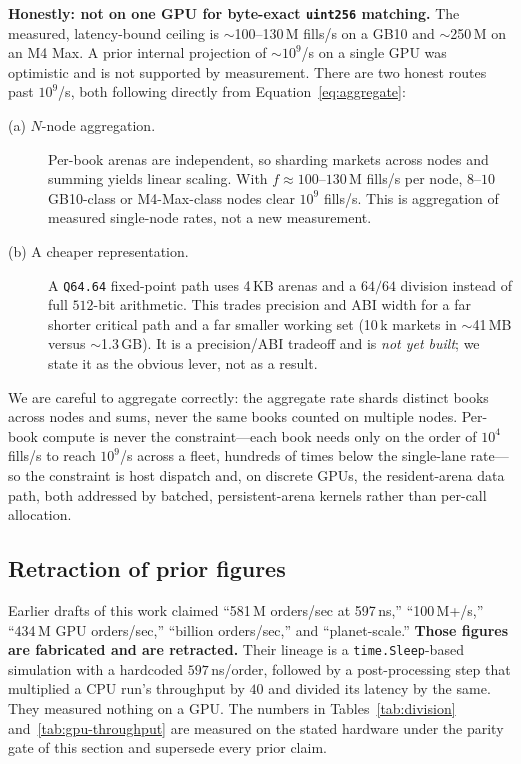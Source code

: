 \textbf{Honestly: not on one GPU for byte-exact \texttt{uint256} matching.} The measured,
latency-bound ceiling is $\sim$100--130\,M fills/s on a GB10 and $\sim$250\,M on an M4 Max.
A prior internal projection of $\sim$$10^{9}$/s on a single GPU was optimistic and is not
supported by measurement. There are two honest routes past $10^{9}$/s, both following
directly from Equation~\eqref{eq:aggregate}:

\begin{description}
  \item[(a) $N$-node aggregation.] Per-book arenas are independent, so sharding markets
  across nodes and summing yields linear scaling. With $f \approx 100\text{--}130$\,M
  fills/s per node, $8$--$10$ GB10-class or M4-Max-class nodes clear $10^{9}$ fills/s. This
  is aggregation of measured single-node rates, not a new measurement.
  \item[(b) A cheaper representation.] A \texttt{Q64.64} fixed-point path uses 4\,KB arenas
  and a $64/64$ division instead of full $512$-bit arithmetic. This trades precision and ABI
  width for a far shorter critical path and a far smaller working set (10\,k markets in
  $\sim$41\,MB versus $\sim$1.3\,GB). It is a precision/ABI tradeoff and is \emph{not yet
  built}; we state it as the obvious lever, not as a result.
\end{description}

We are careful to aggregate correctly: the aggregate rate shards distinct books across
nodes and sums, never the same books counted on multiple nodes. Per-book compute is never
the constraint---each book needs only on the order of $10^{4}$ fills/s to reach $10^{9}$/s
across a fleet, hundreds of times below the single-lane rate---so the constraint is host
dispatch and, on discrete GPUs, the resident-arena data path, both addressed by batched,
persistent-arena kernels rather than per-call allocation.

\subsection{Retraction of prior figures}
\label{subsec:retraction}

Earlier drafts of this work claimed ``581\,M orders/sec at 597\,ns,'' ``100\,M+/s,''
``434\,M GPU orders/sec,'' ``billion orders/sec,'' and ``planet-scale.'' \textbf{Those
figures are fabricated and are retracted.} Their lineage is a \texttt{time.Sleep}-based
simulation with a hardcoded $597$\,ns/order, followed by a post-processing step that
multiplied a CPU run's throughput by $40$ and divided its latency by the same. They measured
nothing on a GPU. The numbers in Tables~\ref{tab:division} and~\ref{tab:gpu-throughput} are
measured on the stated hardware under the parity gate of this section and supersede every
prior claim.
